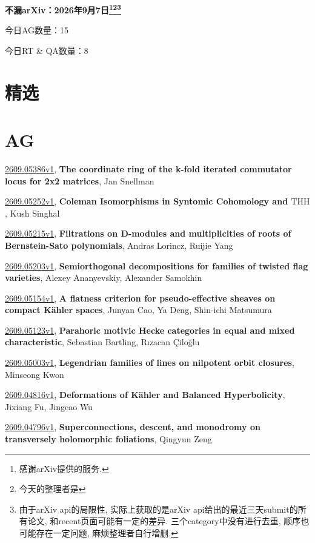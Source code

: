 \documentclass[9pt, a4paper]{article}
\theoremstyle{plain}
\theoremstyle{definition}
\theoremstyle{remark}
\newcommand{\arxiv}[3]{\href{https://arxiv.org/abs/#1}{#1}, \textbf{\textcolor{arxivblue}{#2}}, #3}
\newcommand{\AGnumber}{15}
\newcommand{\RTQAnumber}{8}
\newcommand{\NewestDate}{2026年9月7日}
\newcommand{\todayarXiver}{} %
\begin{document}
\begin{center}
    \Huge\textbf{不漏arXiv：\NewestDate\footnote{感谢arXiv提供的服务.}\footnote{今天的整理者是\todayarXiver}\footnote{由于arXiv api的局限性, 实际上获取的是arXiv api给出的最近三天submit的所有论文, 和recent页面可能有一定的差异. 三个category中没有进行去重, 顺序也可能存在一定问题, 麻烦整理者自行增删.}} \\
\end{center}

\setcounter{section}{-1}

\begin{center}
    今日AG数量：\AGnumber
    
    今日RT \& QA数量：\RTQAnumber
    
\end{center}


\section{精选}


\section{AG}
\arxiv{2609.05386v1}{The coordinate ring of the k-fold iterated commutator locus for 2x2 matrices}{Jan Snellman}

\arxiv{2609.05252v1}{Coleman Isomorphisms in Syntomic Cohomology and $\mathrm{THH}$}{Kush Singhal}

\arxiv{2609.05215v1}{Filtrations on D-modules and multiplicities of roots of Bernstein-Sato polynomials}{Andras Lorincz, Ruijie Yang}

\arxiv{2609.05203v1}{Semiorthogonal decompositions for families of twisted flag varieties}{Alexey Ananyevskiy, Alexander Samokhin}

\arxiv{2609.05154v1}{A flatness criterion for pseudo-effective sheaves on compact Kähler spaces}{Junyan Cao, Ya Deng, Shin-ichi Matsumura}

\arxiv{2609.05123v1}{Parahoric motivic Hecke categories in equal and mixed characteristic}{Sebastian Bartling, Rızacan Çiloğlu}

\arxiv{2609.05003v1}{Legendrian families of lines on nilpotent orbit closures}{Minseong Kwon}

\arxiv{2609.04816v1}{Deformations of Kähler and Balanced Hyperbolicity}{Jixiang Fu, Jingcao Wu}

\arxiv{2609.04796v1}{Superconnections, descent, and monodromy on transversely holomorphic foliations}{Qingyun Zeng}
\end{document}
